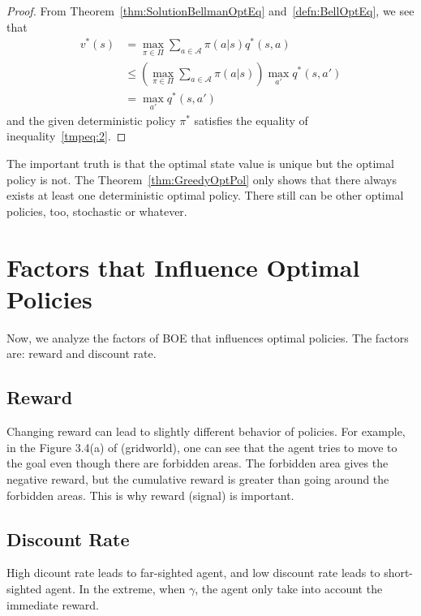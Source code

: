     \begin{proof}
        From Theorem~\ref{thm:SolutionBellmanOptEq} and~\ref{defn:BellOptEq}, we see that
        \begin{align}
            v^*(s) &= \max_{\pi \in \Pi}\sum_{a \in \mathcal{A}}\pi(a|s)q^*(s,a) \\
                        &\leq \left(\max_{\pi \in \Pi}\sum_{a \in \mathcal{A}}\pi(a|s)\right) \max_{a'} q^*(s,a') \label{tmpeq:2} \\
                        &= \max_{a'}q^*(s,a')
        \end{align}
        and the given deterministic policy $\pi^*$ satisfies the equality of inequality~\ref{tmpeq:2}.
    \end{proof}
    The important truth is that the optimal state value is unique but the optimal policy is not. The Theorem~\ref{thm:GreedyOptPol}
    only shows that there always exists at least one deterministic optimal policy. There still can be other optimal policies, too, stochastic or whatever.

\section{Factors that Influence Optimal Policies}
    Now, we analyze the factors of BOE that influences optimal policies. The factors are: reward and discount rate.
    \subsection{Reward}
        Changing reward can lead to slightly different behavior of policies. For example, in the Figure 3.4(a) of \cite{Zhao2025} (gridworld), one can see that
        the agent tries to move to the goal even though there are forbidden areas. The forbidden area gives the negative reward, but the cumulative reward is greater than
        going around the forbidden areas. This is why reward (signal) is important.
    \subsection{Discount Rate}
        High dicount rate leads to far-sighted agent, and low discount rate leads to short-sighted agent. In the extreme, when $\gamma$, the agent only
        take into account the immediate reward.
